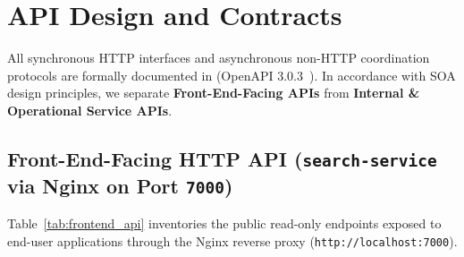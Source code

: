 \documentclass[10pt,a4paper]{article}
\begin{document}
\section{API Design and Contracts}
\label{sec:api_contracts}

All synchronous HTTP interfaces and asynchronous non-HTTP coordination protocols are formally documented in  (OpenAPI 3.0.3~\cite{openapi_spec}). In accordance with SOA design principles, we separate \textbf{Front-End-Facing APIs} from \textbf{Internal \& Operational Service APIs}.

\subsection{Front-End-Facing HTTP API (\texttt{search-service} via Nginx on Port \texttt{7000})}
Table~\ref{tab:frontend_api} inventories the public read-only endpoints exposed to end-user applications through the Nginx reverse proxy (\texttt{http://localhost:7000}).
\end{document}
